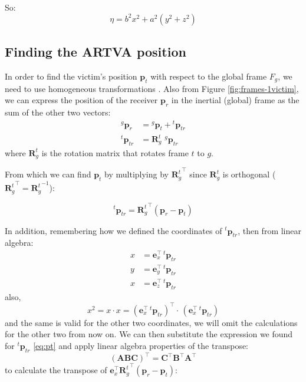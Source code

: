 So:
\begin{equation}
    \eta = b^2 x^2 + a^2 (y^2 + z^2)
    \label{eq:eta}
\end{equation}

\subsection{Finding the ARTVA position}
In order to find the victim's position $\mathbf{p}_t$ with respect to the global frame $F_g$, we need to use homogeneous transformations \cite{book-robotics}. 
Also from Figure \ref{fig:frames-1victim}, we can express the position of the receiver $\mathbf{p}_r$ in the inertial (global) frame as the sum of the other two vectors:
\[
\begin{aligned}
{}^g \mathbf{p}_r &= {}^g \mathbf{p}_t + {}^t \mathbf{p}_{tr} \\
{}^t \mathbf{p}_{tr} &= \mathbf{R}_g^t \,\, {}^g \mathbf{p}_{tr}
\end{aligned}
\]
where $\mathbf{R}_g^t$ is the rotation matrix that rotates frame $t$ to $g$.

From which we can find $\mathbf{p}_t$ by multiplying by ${\mathbf{R}_g^t}^\top$ since ${\mathbf{R}_g^t}$ is orthogonal (${\mathbf{R}_g^t}^\top = {\mathbf{R}_g^t}^{-1}$):

\begin{equation}
    {}^t \mathbf{p}_{tr} = {\mathbf{R}_g^t}^\top (\mathbf{p}_r - \mathbf{p}_t)
    \label{eq:pt}
\end{equation}

In addition, remembering how we defined the coordinates of ${}^t \mathbf{p}_{tr}$, then from linear algebra:
\[
\begin{aligned}
x &= \mathbf{e}_x^\top \, {}^t \mathbf{p}_{tr} \\
y &= \mathbf{e}_y^\top \, {}^t \mathbf{p}_{tr} \\
x  &= \mathbf{e}_z^\top  \, {}^t \mathbf{p}_{tr}
\end{aligned}
\]
also,
\[
x^2 = x \cdot x = \left( \mathbf{e}_x^\top \, {}^t \mathbf{p}_{tr} \right)^\top \cdot \, \left( \mathbf{e}_x^\top \, {}^t \mathbf{p}_{tr} \right)
\]
and the same is valid for the other two coordinates, we will omit the calculations for the other two from now on. 
We can then substitute the expression we found for ${}^t \mathbf{p}_{tr}$ \ref{eq:pt} and apply linear algebra properties of the transpose:
$$(\mathbf{A}\mathbf{B}\mathbf{C})^\top = \mathbf{C}^\top \mathbf{B}^\top \mathbf{A}^\top$$ to calculate the transpose of $\mathbf{e}_x^\top {\mathbf{R}_g^t}^\top (\mathbf{p}_r - \mathbf{p}_t)$:

